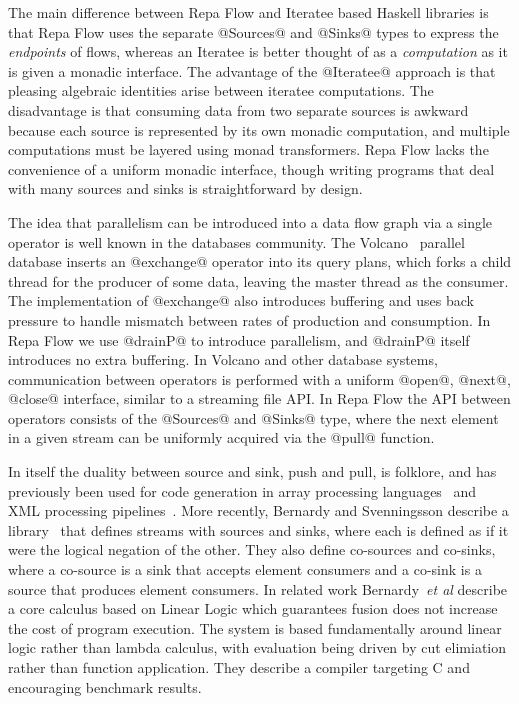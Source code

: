 The main difference between Repa Flow and Iteratee based Haskell libraries 
\cite{Kiselyov:iteratee, hackage:enumerator, hackage:conduit, hackage:pipes} is that Repa Flow uses the separate @Sources@ and @Sinks@ types to express the \emph{endpoints} of flows, whereas an Iteratee is better thought of as a \emph{computation} as it is given a monadic interface. The advantage of the @Iteratee@ approach is that pleasing algebraic identities arise between iteratee computations. The disadvantage is that consuming data from two separate sources is awkward because each source is represented by its own monadic computation, and multiple computations must be layered using monad transformers. Repa Flow lacks the convenience of a uniform monadic interface, though writing programs that deal with many sources and sinks is straightforward by design.

The idea that parallelism can be introduced into a data flow graph via a single operator is well known in the databases community. The Volcano~\cite{Graefe:Volcano} parallel database inserts an @exchange@ operator into its query plans, which forks a child thread for the producer of some data, leaving the master thread as the consumer. The implementation of @exchange@ also introduces buffering and uses back pressure to handle mismatch between rates of production and consumption. In Repa Flow we use @drainP@ to introduce parallelism, and @drainP@ itself introduces no extra buffering. In Volcano and other database systems, communication between operators is performed with a uniform @open@, @next@, @close@ interface, similar to a streaming file API. In Repa Flow the API between operators consists of the @Sources@ and @Sinks@ type, where the next element in a given stream can be uniformly acquired via the @pull@ function.

In itself the duality between source and sink, push and pull, is folklore, and has previously been used for code generation in array processing languages~\cite{Claessen:ExpressiveArray,Svensson:Defunctionalizing} and XML processing pipelines~\cite{Kay:YouPull}. More recently, Bernardy and Svenningsson describe a library~\cite{Bernardy:Duality} that defines streams with sources and sinks, where each is defined as if it were the logical negation of the other. They also define co-sources and co-sinks, where a co-source is a sink that accepts element consumers and a co-sink is a source that produces element consumers. In related work Bernardy~\emph{et al} describe a core calculus \cite{Bernardy:Composable} based on Linear Logic which guarantees fusion does not increase the cost of program execution. The system is based fundamentally around linear logic rather than lambda calculus, with evaluation being driven by cut elimiation rather than function application. They describe a compiler targeting C and encouraging benchmark results.


